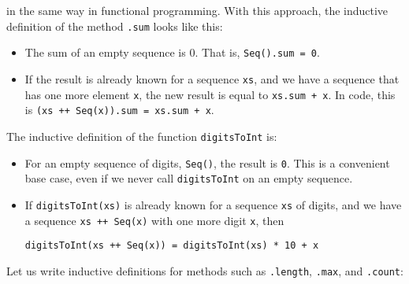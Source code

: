 in the same way in functional programming. With this approach, the
inductive definition of the method \lstinline!.sum!
looks like this:
\begin{itemize}
\item The sum of an empty sequence is $0$. That is, \lstinline!Seq().sum = 0!.
\item If the result is already known for a sequence \lstinline!xs!,
and we have a sequence that has one more element \lstinline!x!,
the new result is equal to \lstinline!xs.sum + x!.
In code, this is \lstinline!(xs ++ Seq(x)).sum = xs.sum + x!.
\end{itemize}
The inductive definition of the function \lstinline!digitsToInt!
is:
\begin{itemize}
\item For an empty sequence of digits, \lstinline!Seq()!,
the result is \lstinline!0!.
This is a convenient base case, even if we never call \lstinline!digitsToInt!
on an empty sequence.
\item If \lstinline!digitsToInt(xs)!
is already known for a sequence \lstinline!xs!
of digits, and we have a sequence \lstinline!xs ++ Seq(x)!
with one more digit \lstinline!x!,
then
\begin{lstlisting}
digitsToInt(xs ++ Seq(x)) = digitsToInt(xs) * 10 + x
\end{lstlisting}
\end{itemize}
Let us write inductive definitions for methods such as \lstinline!.length!,
\lstinline!.max!, and \lstinline!.count!:
